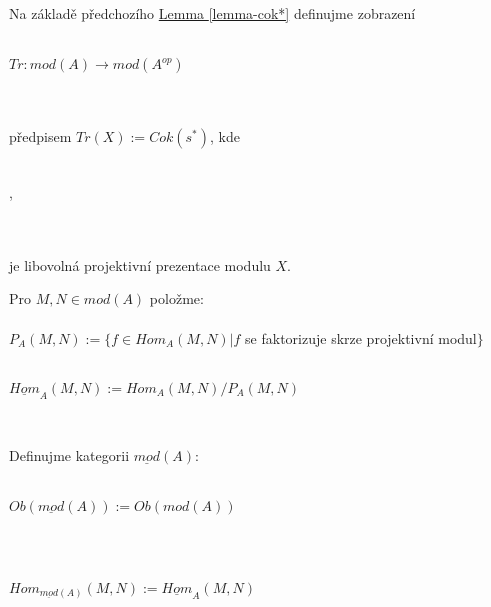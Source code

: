      \begin{dfn}
       Na základě předchozího \hyperref[lemma-cok*]{Lemma \ref*{lemma-cok*}} 
       definujme zobrazení \\\\  
       \centerline{$Tr:mod(A)\rightarrow mod(A^{op})$} \\\\
       předpisem $Tr(X):=Cok(s^*)$, kde \\\\
       \centerline{,}\\\\
       je libovolná projektivní prezentace modulu $X$.       
     \end{dfn}
     
     \begin{dfn}
       \begin{description} \item
         \item[(a)] Pro $M,N\in mod(A)$ položme: 
           \\\\
           $P_A(M,N):=\{f\in Hom_A(M,N)|f$ se faktorizuje skrze projektivní modul$\}$ \\
           \\
          \centerline{$\underline{Hom}_A(M,N):=Hom_A(M,N)/P_A(M,N)$} \\
         \item[(b)] Definujme kategorii $\underline{mod}(A)$: \\\\
           \centerline{$Ob(\underline{mod}(A)):=Ob(mod(A))$}\\\\
           \centerline{$Hom_{\underline{mod}(A)}(M,N):=\underline{Hom}_A(M,N)$}\\ 
       \end{description}       
     \end{dfn}
     
